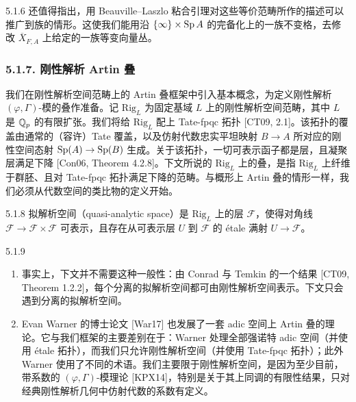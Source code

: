 \begin{rem}{5.1.6}\label{rem:a4-5-1-6}
还值得指出，用 Beauville--Laszlo 粘合引理对这些等价范畴所作的描述可以推广到族的情形。这使我们能用沿 $\{\infty\}\times\operatorname{Sp} A$ 的完备化上的一族不变格，去修改 $\overline{X}_{F,A}$ 上给定的一族等变向量丛。
\end{rem}

\subsubsection*{5.1.7. 刚性解析 Artin 叠}
我们在刚性解析空间范畴上的 Artin 叠框架中引入基本概念，为定义刚性解析 $(\varphi,\Gamma)$-模的叠作准备。记 $\mathrm{Rig}_L$ 为固定基域 $L$ 上的刚性解析空间范畴，其中 $L$ 是 $\mathbb{Q}_p$ 的有限扩张。我们将给 $\mathrm{Rig}_L$ 配上 Tate-fpqc 拓扑 [CT09, 2.1]。该拓扑的覆盖由通常的（容许）Tate 覆盖，以及仿射代数忠实平坦映射 $B\to A$ 所对应的刚性空间态射 $\operatorname{Sp}(A)\to\operatorname{Sp}(B)$ 生成。关于该拓扑，一切可表示函子都是层，且凝聚层满足下降 [Con06, Theorem 4.2.8]。下文所说的 $\mathrm{Rig}_L$ 上的叠，是指 $\mathrm{Rig}_L$ 上纤维于群胚、且对 Tate-fpqc 拓扑满足下降的范畴。与概形上 Artin 叠的情形一样，我们必须从代数空间的类比物的定义开始。

\begin{defn}{5.1.8}\label{defn:a4-5-1-8}
拟解析空间（quasi-analytic space）是 $\mathrm{Rig}_L$ 上的层 $\mathcal{F}$，使得对角线 $\mathcal{F}\to\mathcal{F}\times\mathcal{F}$ 可表示，且存在从可表示层 $U$ 到 $\mathcal{F}$ 的 étale 满射 $U\to\mathcal{F}$。
\end{defn}

\begin{rem}{5.1.9}\label{rem:a4-5-1-9}
\begin{enumerate}[label=(\roman*),leftmargin=2.4em,itemsep=0.2em]
\item 事实上，下文并不需要这种一般性：由 Conrad 与 Temkin 的一个结果 [CT09, Theorem 1.2.2]，每个分离的拟解析空间都可由刚性解析空间表示。下文只会遇到分离的拟解析空间。
\item Evan Warner 的博士论文 [War17] 也发展了一套 adic 空间上 Artin 叠的理论。它与我们框架的主要差别在于：Warner 处理全部强诺特 adic 空间（并使用 étale 拓扑），而我们只允许刚性解析空间（并使用 Tate-fpqc 拓扑）；此外 Warner 使用了不同的术语。我们主要限于刚性解析空间，是因为至少目前，带系数的 $(\varphi,\Gamma)$-模理论 [KPX14]，特别是关于其上同调的有限性结果，只对经典刚性解析几何中仿射代数的系数有定义。
\end{enumerate}
\end{rem}

